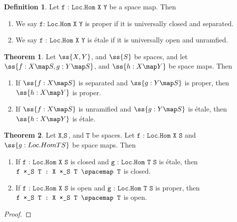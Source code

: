 \documentclass{book}
\theoremstyle{definition}
\newtheorem{definition}{Definition}
\newtheorem{theorem}{Theorem}
\begin{document}
\begin{definition}
Let $\texttt{f : Loc.Hom X Y}$ be a space map. Then
\begin{enumerate}
\item We say $\texttt{f: Loc.Hom X Y}$ is proper if it is universally closed and separated.
\item We say $\texttt{f : Loc.Hom X Y}$ is étale if it is universally open and unramfied.
\end{enumerate}
\end{definition}

\begin{theorem}
Let $\ss{X, Y}$, and $\ss{S}$ be spaces, and let $\ss{f : X \map S, g : Y \map S}$, and $\ss{h : X \map Y}$ be space maps. Then
\begin{enumerate}
\item If $\ss{f : X \map S}$ is separated and $\ss{g : Y \map S}$ is proper, then $\ss{h : X \map Y}$ is proper.
\item If $\ss{f : X \map S}$ is unramified and $\ss{g : Y \map S}$ is étale, then $\ss{h : X \map Y}$ is étale.
\end{enumerate}
\end{theorem}

\begin{theorem}
Let $\texttt{X}, \texttt{S}$, and $\texttt{T}$ be spaces. Let $\texttt{f : Loc.Hom X S}$ and $\ss{g : Loc.Hom T S}$ be space maps. Then
\begin{enumerate}
\item If $\texttt{f : Loc.Hom X S}$ is closed and $\texttt{g : Loc.Hom T S}$ is étale, then $\texttt{f ×\_S T : X ×\_S T \spacemap T}$ is closed.
\item If $\texttt{f : Loc.Hom X S}$ is open and $\texttt{g : Loc.Hom T S}$ is proper, then $\texttt{f ×\_S T : X ×\_S T \spacemap T}$ is open.
\end{enumerate} 
\end{theorem}

\begin{proof}

\end{proof}
\end{document}
